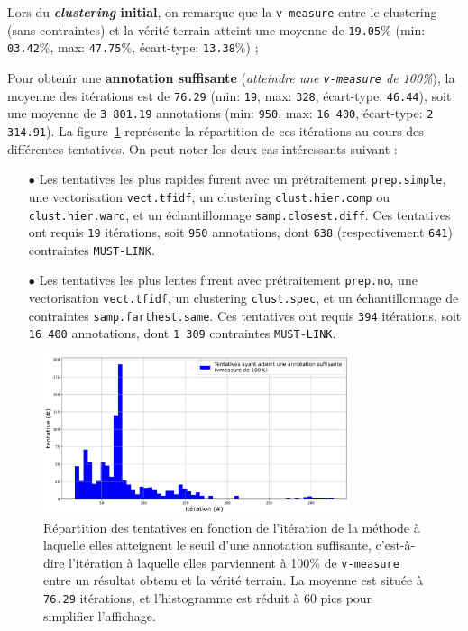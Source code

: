 				
				Lors du \textbf{\textit{clustering} initial}, on remarque que la \texttt{v-measure} entre le clustering (sans contraintes) et la vérité terrain atteint une moyenne de \texttt{19.05}\% (min: \texttt{03.42}\%, max: \texttt{47.75}\%, écart-type: \texttt{13.38}\%) ;
				
				Pour obtenir une \textbf{annotation suffisante} (\textit{atteindre une \texttt{v-measure} de 100\%}), la moyenne des itérations est de \texttt{76.29} (min: \texttt{19}, max: \texttt{328}, écart-type: \texttt{46.44}), soit une moyenne de \texttt{3 801.19} annotations (min: \texttt{950}, max: \texttt{16 400}, écart-type: \texttt{2 314.91}).
				La figure~\ref{figure:4.1.1-ETUDE-CONVERGENCE-HISTOGRAMME-ANNOTATION-SUFFISANTE} représente la répartition de ces itérations au cours des différentes tentatives.
				On peut noter les deux cas intéressants suivant :
				\begin{itemize}
					\item[\(\bullet\)] Les tentatives les plus rapides furent avec un prétraitement \texttt{prep.simple}, une vectorisation \texttt{vect.tfidf}, un clustering \texttt{clust.hier.comp} ou \texttt{clust.hier.ward}, et un échantillonnage \texttt{samp.closest.diff}. Ces tentatives ont requis \texttt{19} itérations, soit \texttt{950} annotations, dont \texttt{638} (respectivement \texttt{641}) contraintes \texttt{MUST-LINK}.
					\item[\(\bullet\)] Les tentatives les plus lentes furent avec prétraitement \texttt{prep.no}, une vectorisation \texttt{vect.tfidf}, un clustering \texttt{clust.spec}, et un échantillonnage de contraintes \texttt{samp.farthest.same}. Ces tentatives ont requis \texttt{394} itérations, soit \texttt{16 400} annotations, dont \texttt{1 309} contraintes \texttt{MUST-LINK}.
				\end{itemize}
				\begin{figure}[H]
					\centering
					\includegraphics[width=0.8\textwidth]{figures/etude-convergence-histogramme-annotation-suffisante}
					\caption{Répartition des tentatives en fonction de l'itération de la méthode à laquelle elles atteignent le seuil d'une annotation suffisante, c'est-à-dire l'itération à laquelle elles parviennent à 100\% de \texttt{v-measure} entre un résultat obtenu et la vérité terrain. La moyenne est située à \texttt{76.29} itérations, et l'histogramme est réduit à 60 pics pour simplifier l'affichage.}
					\label{figure:4.1.1-ETUDE-CONVERGENCE-HISTOGRAMME-ANNOTATION-SUFFISANTE}
				\end{figure}
				
